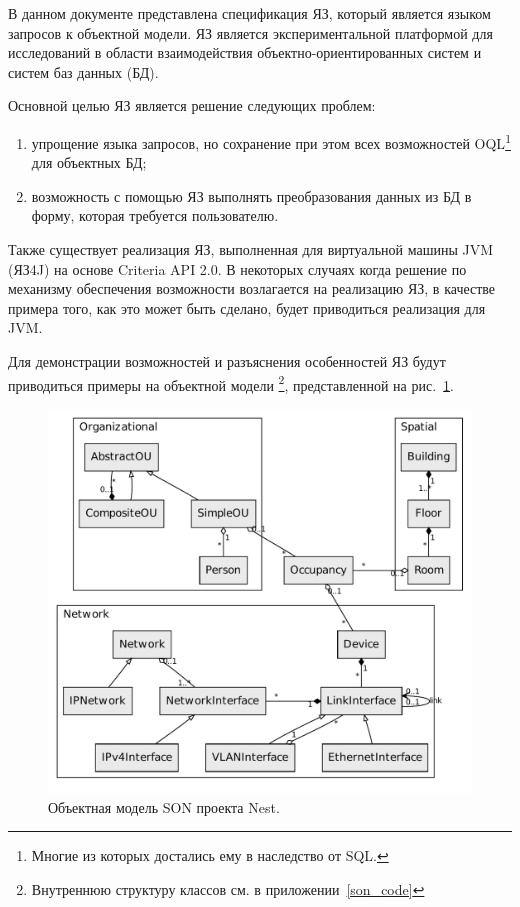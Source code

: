 В данном документе представлена спецификация ЯЗ, который 
является языком запросов к объектной модели.%
ЯЗ является экспериментальной платформой для исследований в области
взаимодействия объектно-ориентированных систем и систем баз данных (БД).

Основной целью ЯЗ является решение следующих проблем:
\begin{enumerate}
    \item упрощение языка запросов, но сохранение при этом всех возможностей
    OQL\footnote{Многие из которых достались ему в наследство от SQL.} для объектных БД;
    \item возможность с помощью ЯЗ выполнять преобразования
данных из БД в форму, которая требуется пользователю.
\end{enumerate}

Также существует реализация ЯЗ, выполненная  
для виртуальной машины JVM (ЯЗ4J) на основе Criteria API 2.0.%
В некоторых случаях когда решение по
механизму обеспечения возможности возлагается на реализацию ЯЗ, 
в качестве примера того, как это может быть сделано, будет приводиться реализация для JVM.

Для демонстрации возможностей и разъяснения особенностей ЯЗ будут приводиться
примеры на объектной модели
\footnote{Внутреннюю структуру классов см. в приложении~\ref{son_code}}, представленной на рис.~\ref{fig:son-model}.

\begin{figure}[hbt]
  \centering
  \includegraphics[scale=0.7]{figures/son}
  \caption{Объектная модель SON проекта Nest.}%
  \label{fig:son-model}
\end{figure}

